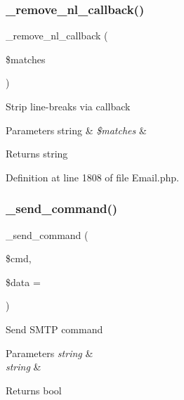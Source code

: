 \subsubsection{\texorpdfstring{\_remove\_nl\_callback()}{\_remove\_nl\_callback()}}
{\footnotesize\ttfamily \+\_\+remove\+\_\+nl\+\_\+callback (\begin{DoxyParamCaption}\item[{}]{\$matches }\end{DoxyParamCaption})\hspace{0.3cm}{\ttfamily [protected]}}

Strip line-\/breaks via callback


\begin{DoxyParams}[1]{Parameters}
string & {\em \$matches} & \\
\hline
\end{DoxyParams}
\begin{DoxyReturn}{Returns}
string 
\end{DoxyReturn}


Definition at line 1808 of file Email.\+php.

\mbox{\label{class_c_i___email_a5431c3309ee720b3d1cc55c892359371}} 
\subsubsection{\texorpdfstring{\_send\_command()}{\_send\_command()}}
{\footnotesize\ttfamily \+\_\+send\+\_\+command (\begin{DoxyParamCaption}\item[{}]{\$cmd,  }\item[{}]{\$data = {\ttfamily \textquotesingle{}\textquotesingle{}} }\end{DoxyParamCaption})\hspace{0.3cm}{\ttfamily [protected]}}

Send S\+M\+TP command


\begin{DoxyParams}{Parameters}
{\em string} & \\
\hline
{\em string} & \\
\hline
\end{DoxyParams}
\begin{DoxyReturn}{Returns}
bool 
\end{DoxyReturn}


